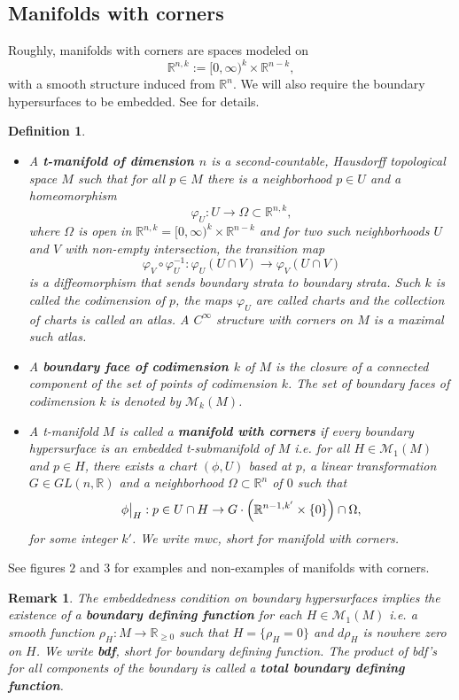 \documentclass[a4paper,11pt]{article}
\newcounter{mythm}[section]
\newtheorem{defi}[mythm]{Definition}
\newtheorem{rem}[mythm]{Remark}
\def\R{\mathbb{R}}
\newcommand\restr[2]{{%
  \left.\kern-\nulldelimiterspace %
  #1 %
  \littletaller %
  \right|_{#2} %
  }}
\newcommand{\littletaller}{\mathchoice{\vphantom{\big|}}{}{}{}}
\begin{document}
\subsection{Manifolds with corners}
Roughly, manifolds with corners are spaces modeled on 
$$
\R^{n,k} := [0, \infty)^{k} \times \R^{n-k},
$$
with a smooth structure induced from $\R^{n}$. We will also require the boundary hypersurfaces to be embedded. See \cite{melrose1996differential, melrose_atiyah-patodi-singer_1993} for details. 
\begin{defi}
\label{def:manifold-with-corners}
\hfill
\begin{itemize}
    \item A \textbf{t-manifold of dimension \(n\)} is a second-countable, Hausdorff topological space \(M\) such that for all \(p \in M\) there is a neighborhood \(p \in U\) and a homeomorphism
\[
\varphi_U: U \longrightarrow \Omega \subset \R^{n,k},
\]
where \(\Omega\) is open in \( \R^{n,k} = [0,\infty)^{k} \times \mathbb{R}^{n-k}\) and for two such neighborhoods $U$ and $V$ with non-empty intersection, the \emph{transition map}
\[
\varphi_V \circ \varphi_U^{-1} : \varphi_U(U \cap V) \longrightarrow \varphi_V(U \cap V)
\]
is a diffeomorphism that sends boundary strata to boundary strata. Such $k$ is called the \emph{codimension} of $p$, the maps $\varphi_U$ are called \emph{charts} and the collection of charts is called an \emph{atlas}.
A $C^\infty$ structure with corners on $M$ is a maximal such atlas.
\item A \textbf{boundary face of codimension $k$} of $M$ is the closure of a connected component of the set of points of codimension $k$. The set of boundary faces of codimension $k$ is denoted by $\mathcal{M}_k(M)$. 
\item A t-manifold $M$ is called a \textbf{manifold with corners} if every boundary hypersurface is an embedded t-submanifold of $M$ i.e. for all $H \in \mathcal{M}_1(M)$ and $p \in H$, there exists a chart $(\phi, U)$ based at $p$, a linear transformation $G \in GL(n, \R)$ and a neighborhood $\Omega \subset \R^n$ of $0$ such that 
$$
\restr{\phi}{H} : p \in U \cap H \rightarrow G \cdot \left( \R^{n-1, k'} \times \{ 0\} \right) \cap \Omega,
$$
for some integer $k'$. We write \emph{mwc}, short for manifold with corners.
\end{itemize}
\end{defi}
See figures $2$ and $3$ for examples and non-examples of manifolds with corners.
\begin{rem}
    The embeddedness condition on boundary hypersurfaces implies the existence of a \textbf{boundary defining function} for each $H \in \mathcal{M}_1(M)$ i.e. a smooth function $\rho_H : M \rightarrow \R_{\geq 0}$ such that $H = \{ \rho_H = 0 \}$ and $d \rho_H$ is nowhere zero on $H$. We write \textbf{bdf}, short for boundary defining function. The product of bdf's for all components of the boundary is called a \textbf{total boundary defining function}.
\end{rem}
\end{document}
